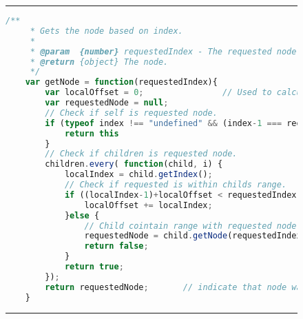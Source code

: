 \begin{figure}[H]
\noindent\rule{\textwidth}{1pt}
\begin{lstlisting}[language=JavaScript, caption={Get node function}, label={lst:getNode}]
    /**
     * Gets the node based on index.
     *
     * @param  {number} requestedIndex - The requested node index
     * @return {object} The node.
     */
    var getNode = function(requestedIndex){
        var localOffset = 0;                // Used to calculate relative index.
        var requestedNode = null;
        // Check if self is requested node.
        if (typeof index !== "undefined" && (index-1 === requestedIndex)) { 
            return this
        }
        // Check if children is requested node.
        children.every( function(child, i) { 
            localIndex = child.getIndex();
            // Check if requested is within childs range.
            if ((localIndex-1)+localOffset < requestedIndex){               
                localOffset += localIndex;
            }else {
                // Child cointain range with requested node.
                requestedNode = child.getNode(requestedIndex - localOffset);
                return false;
            }
            return true;
        });
        return requestedNode;       // indicate that node was not found
    }
\end{lstlisting}
\noindent\rule{\textwidth}{1pt}
\end{figure}